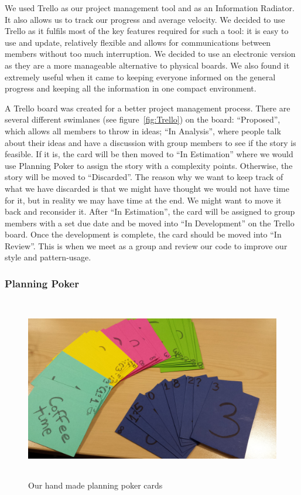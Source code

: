 \documentclass[11pt, a4paper]{article}
\begin{document}
We used Trello as our project management tool and as an Information Radiator\cite{Trello}.
It also allows us to track our progress and average velocity.
We decided to use Trello as it fulfils most of the key features required for such a tool: it is easy to use and update, relatively flexible and allows for communications between members without too much interruption.
We decided to use an electronic version as they are a more manageable alternative to physical boards.
We also found it extremely useful when it came to keeping everyone informed on the general progress and keeping all the information in one compact environment.

A Trello board was created for a better project management process.
There are several different swimlanes (see figure~\ref{fig:Trello}) on the board: ``Proposed'', which allows all members to throw in ideas; ``In Analysis'', where people talk about their ideas and have a discussion with group members to see if the story is feasible.
If it is, the card will be then moved to ``In Estimation'' where we would use Planning Poker to assign the story with a complexity points.
Otherwise, the story will be moved to ``Discarded''.
The reason why we want to keep track of what we have discarded is that we might have thought we would not have time for it, but in reality we may have time at the end.
We might want to move it back and reconsider it.
After ``In Estimation'', the card will be assigned to group members with a set due date and be moved into ``In Development'' on the Trello board.
Once the development is complete, the card should be moved into ``In Review''.
This is when we meet as a group and review our code to improve our style and pattern-usage.

\subsubsection{Planning Poker}
\begin{figure}[h!]
\centering
\includegraphics[height=80mm,width=130mm]{planningPokers.jpg}
\caption{Our hand made planning poker cards}
\end{figure}
\end{document}
